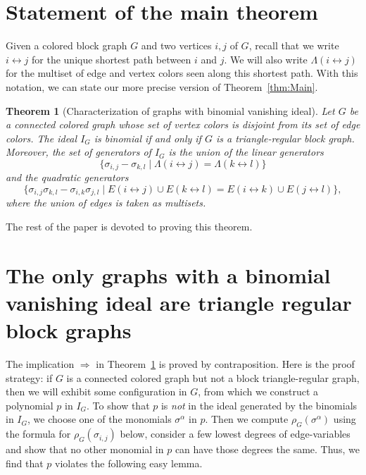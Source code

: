 \documentclass[a4paper, 11pt]{amsart}
\newtheorem{theorem}{Theorem}
\numberwithin{theorem}{section}
\newcommand{\good}{triangle-regular }
\begin{document}
\section{Statement of the main theorem} \label{sec:Theorem}



Given a colored block graph $G$ and two vertices $i,j$ of $G$, recall that
we write $i \leftrightarrow j$ for the unique shortest path between $i$
and $j$. We will also write $\Lambda(i \leftrightarrow j)$ for the multiset
of edge and vertex colors seen along this shortest path. With this
notation, we can state our more precise version of Theorem~\ref{thm:Main}.

\begin{theorem}[Characterization of graphs with binomial vanishing ideal]
\label{thm:CharToric}
    Let $G$ be a connected colored graph whose set of vertex colors is
    disjoint from its set of edge colors. The ideal $I_G$ is binomial
    if and only if $G$ is a triangle-regular block graph. Moreover,
    the set of generators of $I_G$ is the union of the linear
    generators
    $$
        \lbrace \sigma_{i,j}-\sigma_{k,l}\mid \Lambda(i\leftrightarrow j) = \Lambda(k\leftrightarrow l)\rbrace
    $$
    and the quadratic generators
    $$
        \lbrace \sigma_{i,j}\sigma_{k,l}-\sigma_{i,k}\sigma_{j,l}\mid
	E(i\leftrightarrow j)\cup  E(k\leftrightarrow l)=
	E(i\leftrightarrow k)\cup  E(j\leftrightarrow l)\rbrace,
    $$
    where the union of edges is taken as multisets. 
\end{theorem}

The rest of the paper is devoted to proving this theorem. 

\section{The only graphs with a binomial vanishing ideal are triangle
regular block graphs} \label{sec:Necessary}

The implication $\Rightarrow$ in Theorem~\ref{thm:CharToric} is proved by
contraposition. Here is the proof strategy: if $G$ is a connected colored
graph but not a block \good graph, then we will exhibit some configuration
in $G$, from which we construct a polynomial $p$ in $I_G$. To show
that $p$ is {\em not} in the ideal generated by the binomials in $I_G$,
we choose one of the monomials $\sigma^\alpha$ in $p$. Then we compute
$\rho_G(\sigma^\alpha)$ using the formula for $\rho_G(\sigma_{i,j})$
below, consider a few lowest degrees of edge-variables and show that
no other monomial in $p$ can have those degrees the same. Thus, we find
that $p$ violates the following easy lemma.
\end{document}
